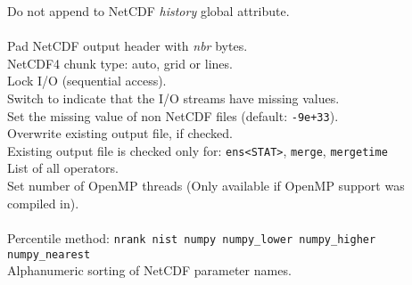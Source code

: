 \begin{tabbing}
         \> Do not append to NetCDF {\it history} global attribute. \\
         \> \\
\makebox[1.5in][l]{\hspace*{1cm}}
         \> Pad NetCDF output header with {\it nbr} bytes. \\
         \> NetCDF4 chunk type: auto, grid or lines. \\
         \> Lock I/O (sequential access). \\
         \> Switch to indicate that the I/O streams have missing values. \\
         \> Set the missing value of non NetCDF files (default: {\tt-9e+33}). \\
         \> Overwrite existing output file, if checked. \\
         \> Existing output file is checked only for: {\tt ens<STAT>}, {\tt merge}, {\tt mergetime} \\
         \> List of all operators. \\
         \> Set number of OpenMP threads (Only available if OpenMP support was compiled in). \\
         \> \\
\makebox[1.5in][l]{\hspace*{1cm}}
         \> Percentile method: {\tt nrank nist numpy numpy\_lower numpy\_higher numpy\_nearest} \\
         \> Alphanumeric sorting of NetCDF parameter names. \\

\end{tabbing}

